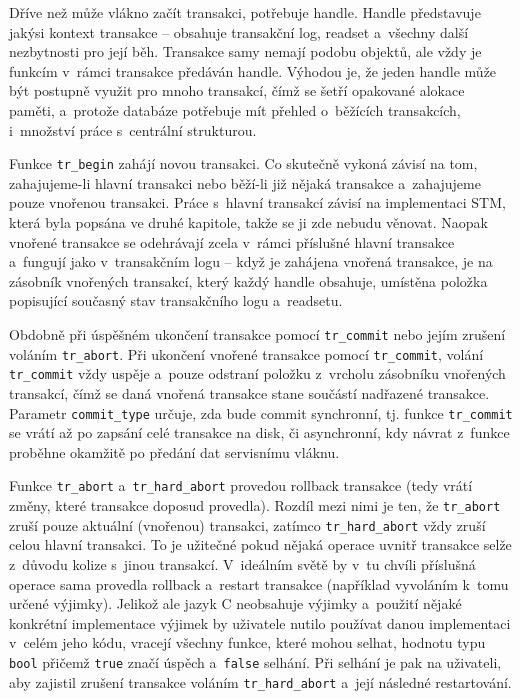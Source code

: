 Dříve než může vlákno začít transakci, potřebuje handle. Handle představuje
jakýsi kontext transakce -- obsahuje transakční log, readset a~všechny další
nezbytnosti pro její běh. Transakce samy nemají podobu objektů, ale vždy
je funkcím v~rámci transakce předáván handle. Výhodou je, že jeden handle může
být postupně využit pro mnoho transakcí, čímž se šetří opakované alokace paměti,
a~protože databáze potřebuje mít přehled o~běžících transakcích, i~množství
práce s~centrální strukturou.

Funkce \verb|tr_begin| zahájí novou transakci. Co skutečně vykoná závisí na tom,
zahajujeme-li hlavní transakci nebo běží-li již nějaká transakce a~zahajujeme pouze
vnořenou transakci. Práce s~hlavní transakcí závisí na implementaci STM,
která byla popsána ve druhé kapitole, takže se ji zde nebudu
věnovat. Naopak vnořené transakce se odehrávají zcela v~rámci příslušné hlavní
transakce a~fungují jako  v~transakčním logu -- když je zahájena vnořená
transakce, je na zásobník vnořených transakcí, který každý handle obsahuje, umístěna
položka popisující současný stav transakčního logu a~readsetu.

Obdobně při úspěšném ukončení transakce pomocí \verb|tr_commit| nebo jejím zrušení
voláním \verb|tr_abort|. Při ukončení vnořené
transakce pomocí \verb|tr_commit|, volání \verb|tr_commit| vždy uspěje a~pouze
odstraní položku z~vrcholu zásobníku vnořených transakcí, čímž se daná vnořená transakce
stane součástí nadřazené transakce. Parametr \verb|commit_type| určuje, zda bude commit
synchronní, tj. funkce \verb|tr_commit| se vrátí až po zapsání celé transakce na disk,
či asynchronní, kdy návrat z~funkce proběhne okamžitě po předání dat servisnímu
vláknu.

Funkce \verb|tr_abort| a~\verb|tr_hard_abort| provedou rollback transakce (tedy vrátí
změny, které transakce doposud provedla). Rozdíl mezi nimi je ten, že \verb|tr_abort|
zruší pouze aktuální (vnořenou) transakci, zatímco \verb|tr_hard_abort| vždy zruší celou
hlavní transakci. To je užitečné pokud nějaká operace uvnitř transakce selže z~důvodu
kolize s~jinou transakcí. V~ideálním světě by v~tu chvíli příslušná operace sama
provedla rollback a~restart transakce (například vyvoláním k~tomu určené výjimky).
Jelikož ale jazyk C neobsahuje výjimky a~použití nějaké konkrétní implementace výjimek
by uživatele nutilo používat danou implementaci v~celém jeho kódu, vracejí všechny
funkce, které mohou selhat, hodnotu typu \verb|bool| přičemž \verb|true| značí úspěch
a~\verb|false| selhání. Při selhání je pak na uživateli, aby zajistil zrušení transakce
voláním \verb|tr_hard_abort| a~její následné restartování.

